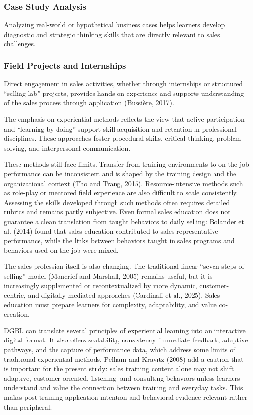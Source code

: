 \documentclass[12pt]{report}
\begin{document}
\subsubsection{Case Study Analysis}
Analyzing real-world or hypothetical business cases helps learners develop diagnostic and strategic thinking skills that are directly relevant to sales challenges.

\subsubsection{Field Projects and Internships}
Direct engagement in sales activities, whether through internships or structured ``selling lab'' projects, provides hands-on experience and supports understanding of the sales process through application (Bussi\`ere, 2017).

The emphasis on experiential methods reflects the view that active participation and ``learning by doing'' support skill acquisition and retention in professional disciplines. These approaches foster procedural skills, critical thinking, problem-solving, and interpersonal communication.

These methods still face limits. Transfer from training environments to on-the-job performance can be inconsistent and is shaped by the training design and the organizational context (Tho and Trang, 2015). Resource-intensive methods such as role-play or mentored field experience are also difficult to scale consistently. Assessing the skills developed through such methods often requires detailed rubrics and remains partly subjective. Even formal sales education does not guarantee a clean translation from taught behaviors to daily selling: Bolander et al. (2014) found that sales education contributed to sales-representative performance, while the links between behaviors taught in sales programs and behaviors used on the job were mixed.

The sales profession itself is also changing. The traditional linear ``seven steps of selling'' model (Moncrief and Marshall, 2005) remains useful, but it is increasingly supplemented or recontextualized by more dynamic, customer-centric, and digitally mediated approaches (Cardinali et al., 2025). Sales education must prepare learners for complexity, adaptability, and value co-creation.

DGBL can translate several principles of experiential learning into an interactive digital format. It also offers scalability, consistency, immediate feedback, adaptive pathways, and the capture of performance data, which address some limits of traditional experiential methods. Pelham and Kravitz (2008) add a caution that is important for the present study: sales training content alone may not shift adaptive, customer-oriented, listening, and consulting behaviors unless learners understand and value the connection between training and everyday tasks. This makes post-training application intention and behavioral evidence relevant rather than peripheral.
\end{document}
